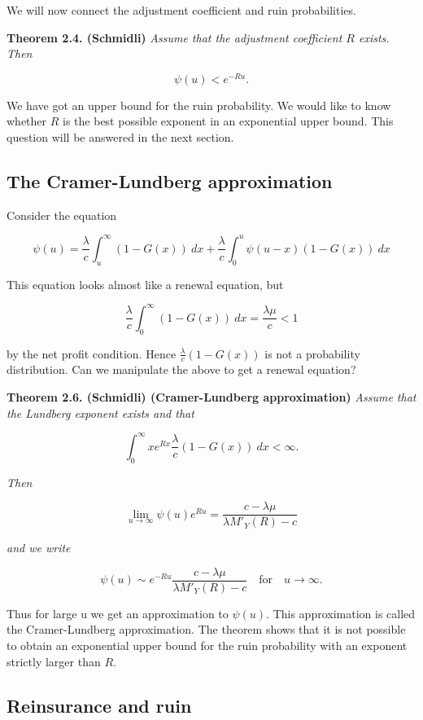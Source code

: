 \documentclass[a4paper,10pt,openany]{book}
\begin{document}
We will now connect the adjustment coefficient and ruin probabilities.

\textbf{Theorem 2.4. (Schmidli)} \emph{Assume that the adjustment coefficient \(R\) exists. Then}

\[
\psi(u)<e^{-Ru}.
\]

We have got an upper bound for the ruin probability. We would like to know whether \(R\) is the best possible exponent in an exponential upper bound. This question will be answered in the next section.

\hypertarget{the-cramer-lundberg-approximation}{%
\subsection{The Cramer-Lundberg approximation}\label{the-cramer-lundberg-approximation}}

Consider the equation

\[
\psi(u)=\frac{\lambda}{c}\int_u^\infty (1-G(x))\ dx+\frac{\lambda}{c}\int_0^u\psi(u-x)(1-G(x))\ dx
\]

This equation looks almost like a renewal equation, but

\[
\frac{\lambda}{c}\int_0^\infty (1-G(x))\ dx=\frac{\lambda \mu}{c}<1
\]

by the net profit condition. Hence \(\frac{\lambda}{c}(1-G(x))\) is not a probability distribution. Can we manipulate the above to get a renewal equation?

\textbf{Theorem 2.6. (Schmidli) (Cramer-Lundberg approximation)} \emph{Assume that the Lundberg exponent exists and that}

\[
\int_0^\infty xe^{Rx}\frac{\lambda}{c}(1-G(x))\ dx<\infty.
\]

\emph{Then}

\[
\lim_{u\to\infty} \psi(u)e^{Ru}=\frac{c-\lambda \mu}{\lambda M'_Y(R)-c}
\]

\emph{and we write}

\[
\psi(u)\sim e^{-Ru}\frac{c-\lambda \mu}{\lambda M'_Y(R)-c} \quad \text{for}\quad u\to\infty.
\]

Thus for large u we get an approximation to \(\psi(u)\). This approximation is called the Cramer-Lundberg approximation. The theorem shows that it is not possible to obtain an exponential upper bound for the ruin probability with an exponent strictly larger than \(R\).

\hypertarget{reinsurance-and-ruin}{%
\subsection{Reinsurance and ruin}\label{reinsurance-and-ruin}}
\end{document}
